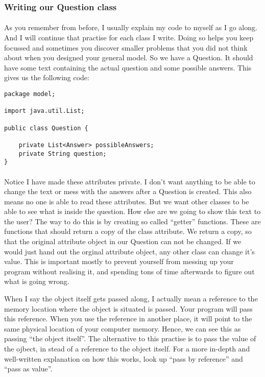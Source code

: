 \documentclass[11pt,fleqn]{book} %
\begin{document}
\subsubsection{Writing our Question class}

\paragraph{}As you remember from before, I usually explain my code to myself as I go along. And I will continue that practise for each class I write. Doing so helps you keep focussed and sometimes you discover smaller problems that you did not think about when you designed your general model.
So we have a Question. It should have some text containing the actual question and some possible answers. This gives us the following code:
\begin{lstlisting}
package model;

import java.util.List;
	
public class Question {
	
	private List<Answer> possibleAnswers;
	private String question;
}
\end{lstlisting}
\paragraph{}Notice I have made these attributes private. I don't want anything to be able to change the text or mess with the answers after a Question is created.
This also means no one is able to read these attributes. But we want other classes to be able to see what is inside the question. How else are we going to show this text to the user?
The way to do this is by creating so called ``getter'' functions. These are functions that should return a copy of the class attribute. We return a copy, so that the original attribute object in our Question can not be changed. If we would just hand out the orginal attribute object, any other class can change it's value. This is important mostly to prevent yourself from messing up your program without realising it, and spending tons of time afterwards to figure out what is going wrong.

\begin{remark}
When I say the object itself gets passed along, I actually mean a reference to the memory location where the object is situated is passed. Your program will pass this reference.
When you use the reference in another place, it will point to the same physical location of your computer memory. Hence, we can see this as passing ``the object itself''. The alternative to this practise is to pass the value of the ojbect, in stead of a reference to the object itself. For a more in-depth and well-written explanation on how this works, look up ``pass by reference'' and ``pass as value''.
\end{remark}
\end{document}
